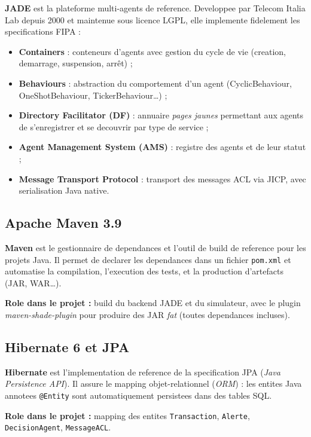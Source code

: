 \documentclass[12pt,a4paper,oneside]{report}
\begin{document}
\textbf{JADE} \cite{jade2007programmer} est la plateforme multi-agents de
reference. Developpee par Telecom Italia Lab depuis 2000 et maintenue sous
licence LGPL, elle implemente fidelement les specifications FIPA :

\begin{itemize}[leftmargin=*]
  \item \textbf{Containers} : conteneurs d'agents avec gestion du cycle de
        vie (creation, demarrage, suspension, arr\^et) ;
  \item \textbf{Behaviours} : abstraction du comportement d'un agent
        (CyclicBehaviour, OneShotBehaviour, TickerBehaviour\dots) ;
  \item \textbf{Directory Facilitator (DF)} : annuaire \emph{pages jaunes}
        permettant aux agents de s'enregistrer et se decouvrir par type de
        service ;
  \item \textbf{Agent Management System (AMS)} : registre des agents et de
        leur statut ;
  \item \textbf{Message Transport Protocol} : transport des messages ACL via
        JICP, avec serialisation Java native.
\end{itemize}

\subsection{Apache Maven 3.9}

\textbf{Maven} est le gestionnaire de dependances et l'outil de build de
reference pour les projets Java. Il permet de declarer les dependances dans
un fichier \texttt{pom.xml} et automatise la compilation, l'execution des
tests, et la production d'artefacts (JAR, WAR\dots).

\textbf{Role dans le projet :} build du backend JADE et du simulateur, avec
le plugin \emph{maven-shade-plugin} pour produire des JAR \emph{fat}
(toutes dependances incluses).

\subsection{Hibernate 6 et JPA}

\textbf{Hibernate} est l'implementation de reference de la specification JPA
(\emph{Java Persistence API}). Il assure le mapping objet-relationnel
(\emph{ORM}) : les entites Java annotees \texttt{@Entity} sont
automatiquement persistees dans des tables SQL.

\textbf{Role dans le projet :} mapping des entites \texttt{Transaction},
\texttt{Alerte}, \texttt{DecisionAgent}, \texttt{MessageACL}.
\end{document}
